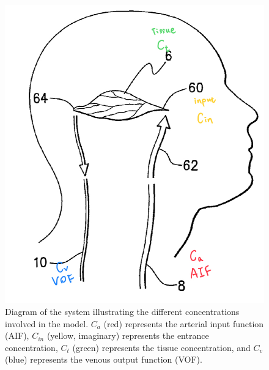 \begin{frame}
\begin{columns}
        \hspace*{4em}  

        \begin{figure}[h]
            \centering
            \includegraphics[width=\textwidth]{figures/method-our.jpeg}
            \caption{Diagram of the system illustrating the different concentrations involved in the model. \(C_a\) (red) represents the arterial input function (AIF), \(C_{in}\) (yellow, imaginary) represents the entrance concentration, \(C_t\) (green) represents the tissue concentration, and \(C_v\) (blue) represents the venous output function (VOF). }
            \label{fig:solution_plot}
        \end{figure}
        
        
    \end{columns}
   

\end{frame}

